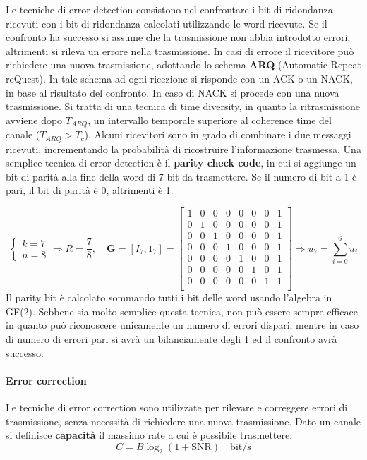 Le tecniche di error detection consistono nel confrontare i bit di ridondanza ricevuti con i bit di ridondanza calcolati utilizzando le word ricevute. 
Se il confronto ha successo si assume che la trasmissione non abbia introdotto errori, altrimenti si rileva un errore nella trasmissione.
In casi di errore il ricevitore può richiedere una nuova trasmissione, adottando lo schema \textbf{ARQ} (Automatic Repeat reQuest).
In tale schema ad ogni ricezione si risponde con un ACK o un NACK, in base al risultato del confronto.
In caso di NACK si procede con una nuova trasmissione. 
Si tratta di una tecnica di time diversity, in quanto la ritrasmissione avviene dopo $T_{ARQ}$, un intervallo temporale superiore al coherence time del canale ($T_{ARQ} > T_c$).
Alcuni ricevitori sono in grado di combinare i due messaggi ricevuti, incrementando la probabilità di ricostruire l'informazione trasmessa.
Una semplice tecnica di error detection è il \textbf{parity check code}, in cui si aggiunge un bit di parità alla fine della word di 7 bit da trasmettere. Se il numero di bit a 1 è pari, il bit di parità è 0, altrimenti è 1.

\[
    \begin{cases}
        k = 7 \\
        n = 8 
    \end{cases}
    \Rightarrow R = \frac{7}{8},
    \quad \mathbf{G} = \left[I_7, 1_7\right] = 
    \begin{bmatrix}
        1 & 0 & 0 & 0 & 0 & 0 & 0 & 1 \\
        0 & 1 & 0 & 0 & 0 & 0 & 0 & 1 \\
        0 & 0 & 1 & 0 & 0 & 0 & 0 & 1 \\
        0 & 0 & 0 & 1 & 0 & 0 & 0 & 1 \\
        0 & 0 & 0 & 0 & 1 & 0 & 0 & 1 \\
        0 & 0 & 0 & 0 & 0 & 1 & 0 & 1 \\
        0 & 0 & 0 & 0 & 0 & 0 & 1 & 1 \\
    \end{bmatrix}
    \Rightarrow u_7 = \sum_{i=0}^{6} u_i
\]
Il parity bit è calcolato sommando tutti i bit delle word usando l'algebra in GF(2).
Sebbene sia molto semplice questa tecnica, non può essere sempre efficace in quanto può riconoscere unicamente un numero di errori dispari, mentre in caso di numero di errori pari si avrà un bilanciamente degli 1 ed il confronto avrà successo.

\paragraph*{Error correction}
Le tecniche di error correction sono utilizzate per rilevare e correggere errori di trasmissione, senza necessità di richiedere una nuova trasmissione.
Dato un canale si definisce \textbf{capacità} il massimo rate a cui è possibile trasmettere:
\[
    C = B \log_2(1 + \text{SNR}) \quad \text{bit/s}
\]

